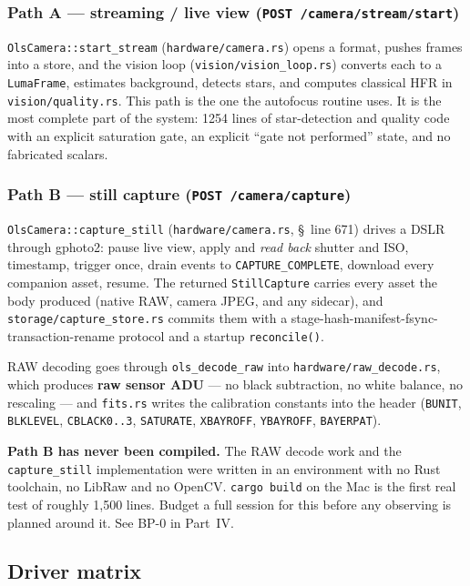 \documentclass[11pt]{article}
\newcommand{\co}[1]{\texttt{\small #1}}
\begin{document}
\subsubsection*{Path A --- streaming / live view (\co{POST /camera/stream/start})}

\co{OlsCamera::start\_stream} (\co{hardware/camera.rs}) opens a format, pushes
frames into a store, and the vision loop (\co{vision/vision\_loop.rs}) converts
each to a \co{LumaFrame}, estimates background, detects stars, and computes
classical HFR in \co{vision/quality.rs}. This path is the one the autofocus
routine uses. It is the most complete part of the system: 1254 lines of
star-detection and quality code with an explicit saturation gate, an explicit
``gate not performed'' state, and no fabricated scalars.

\subsubsection*{Path B --- still capture (\co{POST /camera/capture})}

\co{OlsCamera::capture\_still} (\co{hardware/camera.rs}, \S~line 671) drives a
DSLR through gphoto2: pause live view, apply and \emph{read back} shutter and
ISO, timestamp, trigger once, drain events to \co{CAPTURE\_COMPLETE}, download
every companion asset, resume. The returned \co{StillCapture} carries every
asset the body produced (native RAW, camera JPEG, and any sidecar), and
\co{storage/capture\_store.rs} commits them with a stage-hash-manifest-fsync-
transaction-rename protocol and a startup \co{reconcile()}.

RAW decoding goes through \co{ols\_decode\_raw} into
\co{hardware/raw\_decode.rs}, which produces \textbf{raw sensor ADU} --- no
black subtraction, no white balance, no rescaling --- and \co{fits.rs} writes
the calibration constants into the header (\co{BUNIT}, \co{BLKLEVEL},
\co{CBLACK0..3}, \co{SATURATE}, \co{XBAYROFF}, \co{YBAYROFF}, \co{BAYERPAT}).

\begin{warnbox}
\textbf{Path B has never been compiled.} The RAW decode work and the
\co{capture\_still} implementation were written in an environment with no Rust
toolchain, no LibRaw and no OpenCV. \co{cargo build} on the Mac is the first
real test of roughly 1,500 lines. Budget a full session for this before any
observing is planned around it. See BP-0 in Part~IV.
\end{warnbox}

\subsection{Driver matrix}
\end{document}
